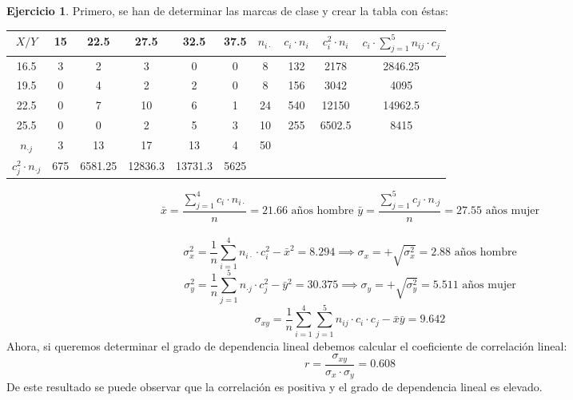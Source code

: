 \documentclass[a4paper, 12pt]{article}
\theoremstyle{definition}
\newtheorem{ej}{Ejercicio}
\begin{document}
\begin{ej}
Primero, se han de determinar las marcas de clase y crear la tabla con éstas:
\begin{center}
\begin{tabular}{c|ccccccccc}
	\(X/Y\) & 15 & 22.5 & 27.5 & 32.5 & 37.5 & $n_{i \cdot} $ & $c_i \cdot n_i$ & $c_i^2 \cdot n_i$ & $c_i \cdot \displaystyle\sum_{j=1}^5 n_{ij}\cdot c_j$\\
	\hline
	16.5 & 3 & 2 & 3 & 0 & 0 & 8 & 132 & 2178 & 2846.25 \\
	19.5 & 0 & 4 & 2 & 2 & 0 & 8 & 156 & 3042 & 4095 \\
	22.5 & 0 & 7 & 10 & 6 & 1 & 24 & 540 & 12150 & 14962.5 \\
	25.5 & 0 & 0 & 2 & 5 & 3 & 10 & 255 & 6502.5 & 8415 \\
	$n_{\cdot j}$ & 3 & 13 & 17 & 13 & 4 & 50 &  &  & \vline 30318.75 \vline \\
	$c_j^2 \cdot n_{\cdot j}$ & 675 & 6581.25 & 12836.3 & 13731.3 & 5625 &  &  &  &  \\
\end{tabular}
\end{center}
$$\bar{x} = \dfrac{\displaystyle\sum_{j=1}^4 c_i \cdot n_{i \cdot}}{n} = 21.66 \text{ años hombre   } \bar{y} = \dfrac{\displaystyle\sum_{j=1}^5 c_j \cdot n_{\cdot j}}{n} = 27.55 \text{ años mujer}$$
\\
$$\sigma_x^2 = \frac{1}{n}\displaystyle\sum_{i=1}^4 n_{i \cdot} \cdot c_i^2 - \bar{x}^2 = 8.294 \implies \sigma_x = +\sqrt{\sigma_x^2} = 2.88 \text{ años hombre}$$
$$\sigma_y^2 = \frac{1}{n}\displaystyle\sum_{j=1}^5 n_{\cdot j} \cdot c_j^2 - \bar{y}^2 = 30.375 \implies \sigma_y = +\sqrt{\sigma_y^2} = 5.511 \text{ años mujer}$$
$$\sigma_{xy} = \frac{1}{n} \displaystyle \sum_{i=1}^4 \sum_{j=1}^5 n_{ij} \cdot c_i \cdot c_j -\bar{x}\bar{y} = 9.642$$
Ahora, si queremos determinar el grado de dependencia lineal debemos calcular el coeficiente de correlación lineal:
$$r = \dfrac{\sigma_{xy}}{\sigma_x \cdot \sigma_y} = 0.608$$
De este resultado se puede observar que la correlación es positiva y el grado de dependencia lineal es elevado.
\end{ej}

\bigskip
\end{document}
